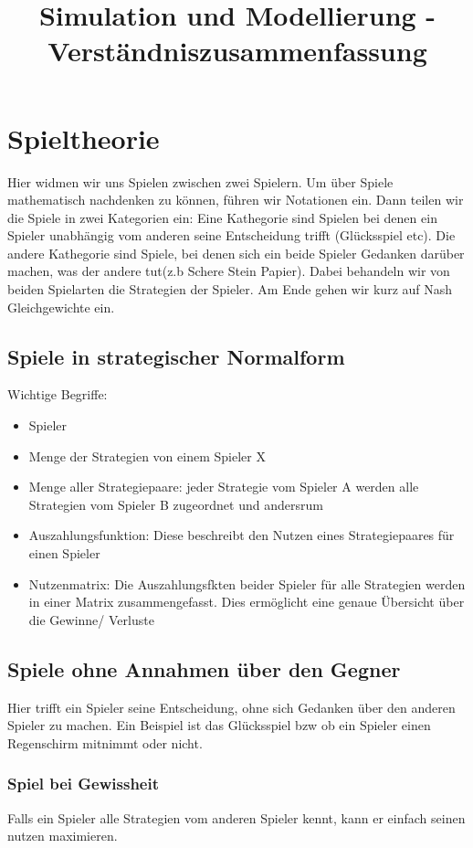\documentclass[]{article}
\title{Simulation und Modellierung - Verständniszusammenfassung}
\author{}
\begin{document}
\maketitle

\section{Spieltheorie}
Hier widmen wir uns Spielen zwischen zwei Spielern. Um über Spiele mathematisch nachdenken zu können, führen wir Notationen ein. Dann teilen wir die Spiele in zwei Kategorien ein: Eine Kathegorie sind Spielen bei denen ein Spieler unabhängig vom anderen seine Entscheidung trifft (Glücksspiel etc). Die andere Kathegorie sind Spiele, bei denen sich ein beide Spieler Gedanken darüber machen, was der andere tut(z.b Schere Stein Papier). Dabei behandeln wir von beiden Spielarten die Strategien der Spieler. Am Ende gehen wir kurz auf Nash Gleichgewichte ein. 

\subsection{Spiele in strategischer Normalform}
Wichtige Begriffe:
\begin{itemize}
	\item Spieler
	\item Menge der Strategien von einem Spieler X
	\item Menge aller Strategiepaare: jeder Strategie vom Spieler A werden alle Strategien vom Spieler B zugeordnet und andersrum
	\item Auszahlungsfunktion: Diese beschreibt den Nutzen eines Strategiepaares für einen Spieler
	\item Nutzenmatrix: Die Auszahlungsfkten beider Spieler für alle Strategien werden in einer Matrix zusammengefasst. Dies ermöglicht eine genaue Übersicht über die Gewinne/ Verluste  
\end{itemize}

\subsection{Spiele ohne Annahmen über den Gegner}
Hier trifft ein Spieler seine Entscheidung, ohne sich Gedanken über den anderen Spieler zu machen. Ein Beispiel ist das Glücksspiel bzw ob ein Spieler einen Regenschirm mitnimmt oder nicht. 

\subsubsection{Spiel bei Gewissheit}
Falls ein Spieler alle Strategien vom anderen Spieler kennt, kann er einfach seinen nutzen maximieren. 
\end{document}
